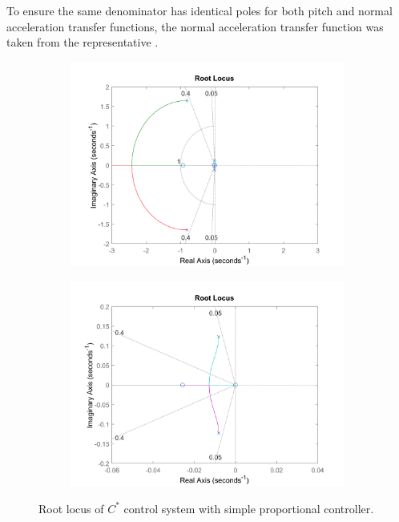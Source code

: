 \documentclass{article}
\begin{document}
To ensure the same denominator has identical poles for both pitch and normal acceleration transfer functions, the normal acceleration transfer function was taken from the representative \cite{rep}.

\begin{figure}[H]
    \centering
    \begin{subfigure}{0.45\textwidth}
        \centering
        \includegraphics[width=0.99\textwidth]{figures/cstar_base_rlocus.png}
    \end{subfigure}
    \begin{subfigure}{0.45\textwidth}
        \centering
        \includegraphics[width=0.99\textwidth]{figures/cstar_base_rlocus_zoomed.png}
    \end{subfigure}
    \caption{Root locus of $C^*$ control system with simple proportional controller.}
    \label{fig:cstar_base_rlocus}
\end{figure}
\end{document}
